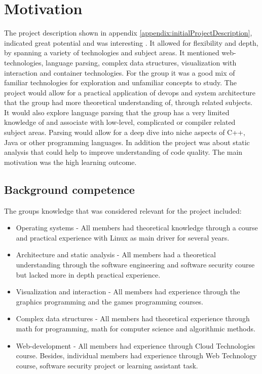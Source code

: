 \section{Motivation}
%
%
The project description shown in appendix \ref{appendix:initialProjectDescription}, indicated great potential and was interesting . It allowed for flexibility and depth, by spanning a variety of technologies and subject areas. It mentioned web-technologies, language parsing, complex data structures, visualization with interaction and container technologies. For the group it was a good mix of familiar technologies for exploration and unfamiliar concepts to study. The project would allow for a practical application of \gls{devops} and system architecture that the group had more theoretical understanding of, through related subjects. It would also explore language parsing that the group has a very limited knowledge of and associate with low-level, complicated or compiler related subject areas. Parsing would allow for a deep dive into niche aspects of C++, Java or other programming languages. In addition the project was about static analysis that could help to improve understanding of code quality. The main motivation was the high learning outcome.

\subsection{Background competence}
\label{sec:competence}

The groups knowledge that was considered relevant for the project included:
\begin{itemize}
    \item Operating systems - All members had theoretical knowledge through a course and practical experience with Linux as main driver for several years.
    \item Architecture and static analysis - All members had a theoretical understanding through the software engineering and software security course but lacked more in depth practical experience.
    \item Visualization and interaction - All members had experience through the graphics programming and the games programming courses. 
    \item Complex data structures - All members had theoretical experience through math for programming, math for computer science and algorithmic methods.
    \item Web-development - All members had experience through Cloud Technologies course. Besides, individual members had experience through Web Technology course, software security project or learning assistant task. 
\end{itemize}
